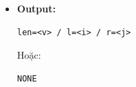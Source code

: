 \begin{itemize}
\begin{itemize}
        \item \textbf{Module 3 (Ghi file):}
        \begin{itemize}
            \item Nếu tồn tại: ghi \texttt{len=<v> / l=<i> / r=<j>}
            \item Ngược lại ghi \texttt{NONE}
        \end{itemize}
    \end{itemize}

    \item \textbf{Output:}
\begin{lstlisting}
len=<v> / l=<i> / r=<j>
\end{lstlisting}
Hoặc:
\begin{lstlisting}
NONE
\end{lstlisting}
\end{itemize}

